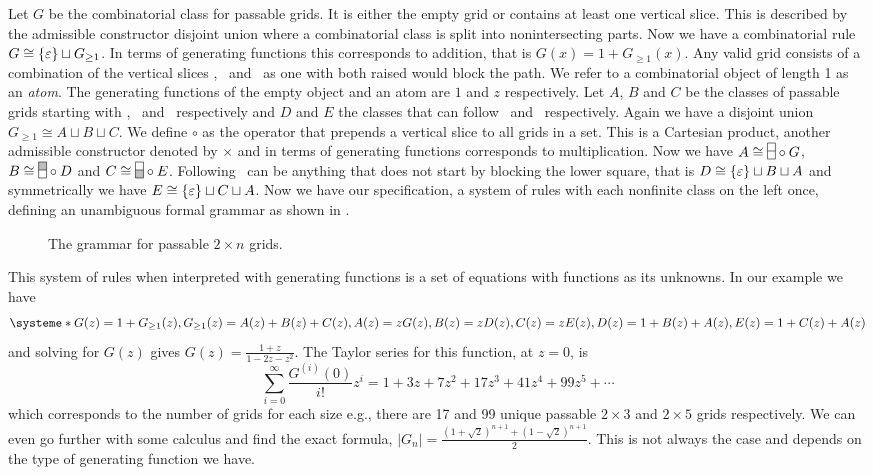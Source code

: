 Let $G$ be the combinatorial class for passable grids. It is either the empty grid or contains at least one vertical slice. This is described by the admissible constructor disjoint union where a combinatorial class is split into nonintersecting parts. Now we have a combinatorial rule $G \cong \left\{\varepsilon\right\} \sqcup G_{\geq 1}$. In terms of generating functions this corresponds to addition, that is $G(x) = 1 + G_{\geq1}(x)$. Any valid grid consists of a combination of the vertical slices \gridN, \gridU\ and \gridD\ as one with both raised would block the path. We refer to a combinatorial object of length 1 as an \emph{atom}. The generating functions of the empty object and an atom are $1$ and $z$ respectively. Let $A$, $B$ and $C$ be the classes of passable grids starting with \gridN, \gridU\ and \gridD\ respectively and $D$ and $E$ the classes that can follow \gridU\ and \gridD\ respectively. Again we have a disjoint union $G_{\geq1} \cong A \sqcup B \sqcup C$. We define $\circ$ as the operator that prepends a vertical slice to all grids in a set. This is a Cartesian product, another admissible constructor denoted by $\times$ and in terms of generating functions corresponds to multiplication. Now we have $A \cong \gridN \circ G$, $B \cong \gridU \circ D$ and $C \cong \gridD \circ E$. Following \gridU\ can be anything that does not start by blocking the lower square, that is $D \cong \left\{\varepsilon\right\} \sqcup B \sqcup A$ and symmetrically we have $E \cong \left\{\varepsilon\right\} \sqcup C \sqcup A$. Now we have our specification, a system of rules with each nonfinite class on the left once, defining an unambiguous formal grammar as shown in .

\begin{figure}[ht!]
    \centering
    
    \caption{The grammar for passable $2\times n$ grids.}
    \label{fig:gridtree}
\end{figure}

This system of rules when interpreted with generating functions is a set of equations with functions as its unknowns. In our example we have
\[
    \systeme*{G(z) = 1 + G_{\geq1}(z), G_{\geq1}(z) = A(z) + B(z) + C(z),A(z) = zG(z), B(z) = zD(z), C(z) = zE(z), D(z) = 1+B(z)+A(z), E(z) = 1+C(z)+A(z)}
\]
and solving for $G(z)$ gives $G(z) = \frac{1+z}{1-2z-z^2}$. The Taylor series for this function, at $z=0$, is
\[
    \sum_{i=0}^\infty \frac{G^{(i)}(0)}{i!}z^i = 1+3z+7z^2+17z^3+ 41z^4 + 99z^5 + \dotsm
\]
which corresponds to the number of grids for each size e.g., there are 17 and 99 unique passable $2\times3$ and $2\times5$ grids respectively. We can even go further with some calculus and find the exact formula, $|G_n| = \frac{\left(1+\sqrt{2}\right)^{n+1} + \left(1-\sqrt{2}\right)^{n+1}}{2}$. This is not always the case and depends on the type of generating function we have.

